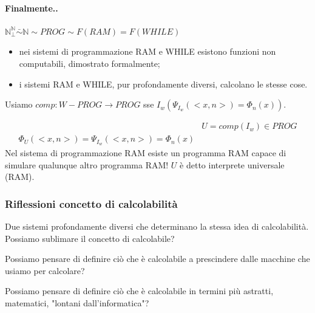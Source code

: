 \documentclass{article}
\begin{document}
\paragraph{Finalmente..}
$\mathbb{N}_{\perp}^{\mathbb{N}} \bar{\sim} \mathbb{N} \sim PROG \sim F(RAM) = F(WHILE)$
\begin{itemize}
	\item nei sistemi di programmazione RAM e WHILE esistono funzioni non computabili, dimostrato formalmente;
	\item i sistemi RAM e WHILE, pur profondamente diversi, calcolano le stesse cose.
\end{itemize}




Usiamo $comp:W-PROG \rightarrow PROG$ sse $I_w(\Psi_{I_w}(<x,n>)=\Phi_n(x))$.

\begin{displaymath}
	\begin{split}
		&U=comp(I_w) \in PROG \\
		\Phi_U(<x,n>)=\Psi_{I_w}(<x,n>)=\Phi_n(x)
	\end{split}
\end{displaymath}
Nel sistema di programmazione RAM esiste un programma RAM capace di simulare qualunque altro programma RAM! $U$ è detto interprete universale (RAM).

\subsubsection{Riflessioni concetto di calcolabilità}
Due sistemi profondamente diversi che determinano la stessa idea di calcolabilità. Possiamo sublimare il concetto di calcolabile?



Possiamo pensare di definire ciò che è calcolabile a prescindere dalle macchine che usiamo per calcolare?



Possiamo pensare di definire ciò che è calcolabile in termini più astratti, matematici, "lontani dall'informatica"?
\end{document}
